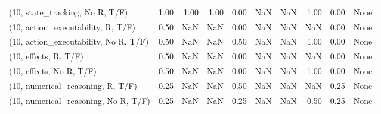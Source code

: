 \begin{table*}[h!]
\begin{adjustbox}{width=2\columnwidth,center}
\begin{tabular}{lrrr|rrr|rrr}
(10, state\_tracking, No R, T/F)       &                      1.00 &                  1.00 &                      1.00 &                          0.00 &                       NaN &                           NaN &                                   1.00 &                               0.00 &                                  None \\
(10, action\_executability, R, T/F)    &                      0.50 &                   NaN &                       NaN &                          0.00 &                       NaN &                           NaN &                                    NaN &                               0.00 &                                  None \\
(10, action\_executability, No R, T/F) &                      0.50 &                   NaN &                       NaN &                          0.50 &                       NaN &                           NaN &                                   1.00 &                               0.00 &                                  None \\
(10, effects, R, T/F)                 &                      0.50 &                   NaN &                       NaN &                          0.00 &                       NaN &                           NaN &                                    NaN &                               0.00 &                                  None \\
(10, effects, No R, T/F)              &                      0.50 &                   NaN &                       NaN &                          0.00 &                       NaN &                           NaN &                                   1.00 &                               0.00 &                                  None \\
(10, numerical\_reasoning, R, T/F)     &                      0.25 &                   NaN &                       NaN &                          0.50 &                       NaN &                           NaN &                                    NaN &                               0.25 &                                  None \\
(10, numerical\_reasoning, No R, T/F)  &                      0.25 &                   NaN &                       NaN &                          0.25 &                       NaN &                           NaN &                                   0.50 &                               0.25 &                                  None \\

\end{tabular}
\end{adjustbox}
\end{table*}
